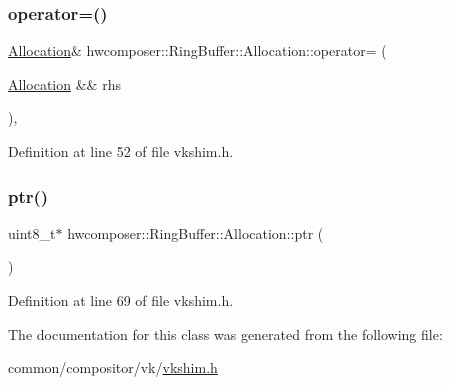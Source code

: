 \subsubsection{\texorpdfstring{operator=()}{operator=()}}
{\footnotesize\ttfamily \mbox{\hyperlink{classhwcomposer_1_1RingBuffer_1_1Allocation}{Allocation}}\& hwcomposer\+::\+Ring\+Buffer\+::\+Allocation\+::operator= (\begin{DoxyParamCaption}\item[{\mbox{\hyperlink{classhwcomposer_1_1RingBuffer_1_1Allocation}{Allocation}} \&\&}]{rhs }\end{DoxyParamCaption})\hspace{0.3cm}{\ttfamily [inline]}, {\ttfamily [noexcept]}}



Definition at line 52 of file vkshim.\+h.


\begin{DoxyCode}{0}
\end{DoxyCode}
\mbox{\label{classhwcomposer_1_1RingBuffer_1_1Allocation_a3b2a81defb09b0aee75fdef9977a0944}} 
\subsubsection{\texorpdfstring{ptr()}{ptr()}}
{\footnotesize\ttfamily uint8\+\_\+t$\ast$ hwcomposer\+::\+Ring\+Buffer\+::\+Allocation\+::ptr (\begin{DoxyParamCaption}{ }\end{DoxyParamCaption})\hspace{0.3cm}{\ttfamily [inline]}}



Definition at line 69 of file vkshim.\+h.


\begin{DoxyCode}{0}
\end{DoxyCode}


The documentation for this class was generated from the following file\+:\begin{DoxyCompactItemize}
\item 
common/compositor/vk/\mbox{\hyperlink{vkshim_8h}{vkshim.\+h}}\end{DoxyCompactItemize}
